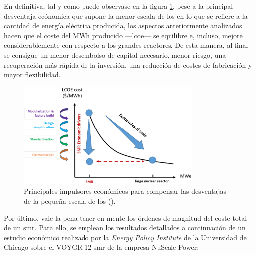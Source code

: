 En definitiva, tal y como puede observase en la figura \ref{fig:economy}, pese a la principal desventaja ecónomica que supone la menor escala de los  en lo que se refiere a la cantidad de energía eléctrica producida, los aspectos anteriormente analizados hacen que el coste del MWh producido ---\acrfull{lcoe}--- se equilibre e, incluso, mejore considerablemente con respecto a los grandes reactores. De esta manera, al final se consigue un menor desembolso de capital necesario, menor riesgo, una recuperación más rápida de la inversión, una reducción de costes de fabricación y mayor flexibilidad.

\begin{figure}[h]
  \centering
  \includegraphics[width=0.8\textwidth]{content/figures/economy.png}
  \caption{Principales impulsores económicos para compensar las desventajas de la pequeña escala de los  (\cite{nea_smrs_2021}).}
  \label{fig:economy}
\end{figure}

Por último, vale la pena tener en mente los órdenes de magnitud del coste total de un \acrlong{smr}. Para ello, se emplean los resultados detallados a continuación de un estudio económico realizado por la \emph{Energy Policy Institute} de la Universidad de Chicago sobre el VOYGR-12 \acrshort{smr} de la empresa NuScale Power: 

